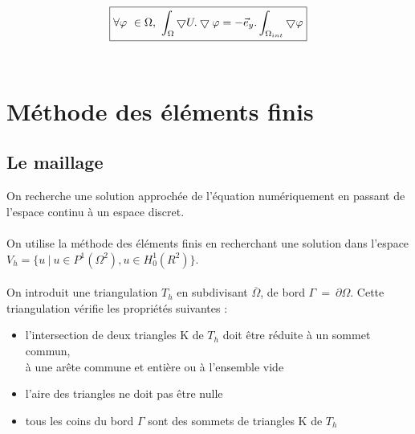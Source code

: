 \documentclass[a4paper,12pt,titlepage]{report}
\begin{document}
\begin{onehalfspace}
\begin{equation}
\boxed{
\label{A}
	\forall \varphi\  \in \Omega,\ \int_{\Omega}\bigtriangledown U.\bigtriangledown \varphi
	=- \vec{e}_{y}.\int_{\Omega_{int}}\bigtriangledown \varphi}
\end{equation}
\\

\section{Méthode des éléments finis}

\subsection{Le maillage}
On recherche une solution approchée de l'équation numériquement en passant de l'espace continu à un espace discret. \\
\\
On utilise la méthode des éléments finis en recherchant une solution dans l'espace 
$V_{h} = \{u \ | \ u \in P^{1}(\Omega^{2}), u \in H^{1}_{0}(R^{2})\}$. \\
\\
On introduit une triangulation $T_{h}$ en subdivisant $\overline{\Omega}$, de bord $\Gamma \ = \ \partial\Omega$. 
Cette triangulation vérifie les propriétés suivantes :
\\
\begin{itemize}
  \item l’intersection de deux triangles K de $T_{h}$ doit être réduite à un sommet commun,\\ à une arête commune et entière ou à l'ensemble vide
  \item l’aire des triangles ne doit pas être nulle
  \item tous les coins du bord $\Gamma$ sont des sommets de triangles K de $T_{h}$
\end{itemize}


\end{onehalfspace}
\end{document}
